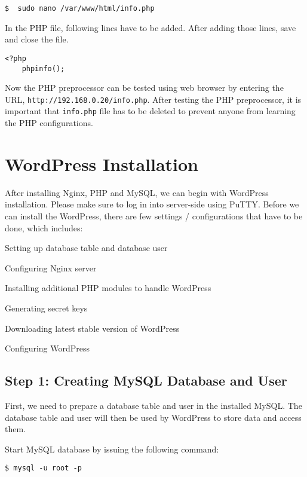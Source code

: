\begin{lstlisting}
$  sudo nano /var/www/html/info.php
\end{lstlisting}

In the PHP file, following lines have to be added. After adding those lines, save and close the file.
\begin{lstlisting}
<?php
    phpinfo();
\end{lstlisting}

Now the PHP preprocessor can be tested using web browser by entering the URL, \texttt{http://192.168.0.20/info.php}. After testing the PHP preprocessor, it is important that \texttt{info.php} file has to be deleted to prevent anyone from learning the PHP configurations.

\section{WordPress Installation} \label{sec:wordpress-installation}
After installing Nginx, PHP and MySQL, we can begin with WordPress installation. Please make sure to log in into server-side using PuTTY. Before we can install the WordPress, there are few settings / configurations that have to be done, which includes:
\begin{itemize*}
\item Setting up database table and database user
\item Configuring Nginx server
\item Installing additional PHP modules to handle WordPress
\item Generating secret keys
\item Downloading latest stable version of WordPress
\item Configuring WordPress
\end{itemize*}

\subsection*{Step 1: Creating MySQL Database and User}

First, we need to prepare a database table and user in the installed MySQL. The database table and user will then be used by WordPress to store data and access them.

Start MySQL database by issuing the following command:

\begin{lstlisting}
$ mysql -u root -p
\end{lstlisting}

